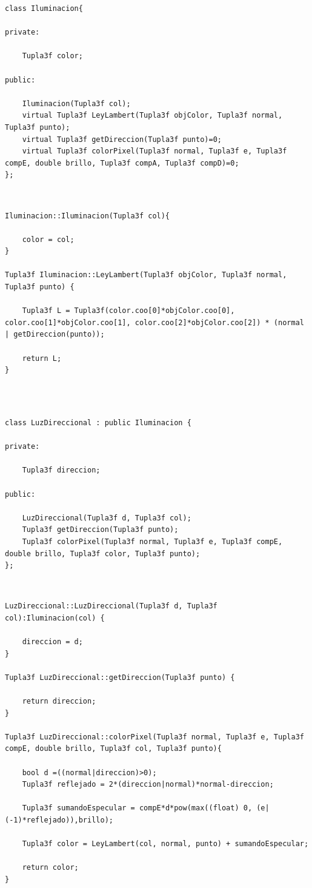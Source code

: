 \begin{lstlisting}[style=Consola]
class Iluminacion{

private:

	Tupla3f color;

public:

	Iluminacion(Tupla3f col);
	virtual Tupla3f LeyLambert(Tupla3f objColor, Tupla3f normal, Tupla3f punto);
	virtual Tupla3f getDireccion(Tupla3f punto)=0;
	virtual Tupla3f colorPixel(Tupla3f normal, Tupla3f e, Tupla3f compE, double brillo, Tupla3f compA, Tupla3f compD)=0;
};
\end{lstlisting}
${ }$\\

\begin{lstlisting}[style=Consola]
Iluminacion::Iluminacion(Tupla3f col){

	color = col;
}

Tupla3f Iluminacion::LeyLambert(Tupla3f objColor, Tupla3f normal, Tupla3f punto) {

	Tupla3f L = Tupla3f(color.coo[0]*objColor.coo[0], color.coo[1]*objColor.coo[1], color.coo[2]*objColor.coo[2]) * (normal | getDireccion(punto));
	
	return L;
}
\end{lstlisting}
${ }$\\


\begin{lstlisting}[style=Consola]

class LuzDireccional : public Iluminacion {

private:

	Tupla3f direccion;

public:

	LuzDireccional(Tupla3f d, Tupla3f col);
	Tupla3f getDireccion(Tupla3f punto);
	Tupla3f colorPixel(Tupla3f normal, Tupla3f e, Tupla3f compE, double brillo, Tupla3f color, Tupla3f punto);
};
\end{lstlisting}
${ }$\\

\begin{lstlisting}[style=Consola]
LuzDireccional::LuzDireccional(Tupla3f d, Tupla3f col):Iluminacion(col) {

	direccion = d;
}

Tupla3f LuzDireccional::getDireccion(Tupla3f punto) {

	return direccion;
}

Tupla3f LuzDireccional::colorPixel(Tupla3f normal, Tupla3f e, Tupla3f compE, double brillo, Tupla3f col, Tupla3f punto){

	bool d =((normal|direccion)>0);
	Tupla3f reflejado = 2*(direccion|normal)*normal-direccion;

	Tupla3f sumandoEspecular = compE*d*pow(max((float) 0, (e|(-1)*reflejado)),brillo);
	
	Tupla3f color = LeyLambert(col, normal, punto) + sumandoEspecular;

	return color;
}


\end{lstlisting}
${ }$\\

